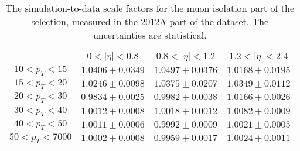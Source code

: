 \begin{table}[!ht]
\begin{center}
\begin{tabular}{c|c|c|c}
\hline & $0 < |\eta| < 0.8$ & $0.8 < |\eta| < 1.2$ & $1.2 < |\eta| < 2.4$  \\
\hline
$ 10 < p_T <  15$ & $1.0406 \pm 0.0349$ & $1.0497 \pm 0.0376$ & $1.0168 \pm 0.0195$  \\
$ 15 < p_T <  20$ & $1.0246 \pm 0.0098$ & $1.0375 \pm 0.0207$ & $1.0349 \pm 0.0112$  \\
$ 20 < p_T <  30$ & $0.9834 \pm 0.0025$ & $0.9982 \pm 0.0038$ & $1.0166 \pm 0.0026$  \\
$ 30 < p_T <  40$ & $1.0012 \pm 0.0008$ & $1.0018 \pm 0.0012$ & $1.0082 \pm 0.0009$  \\
$ 40 < p_T <  50$ & $1.0011 \pm 0.0006$ & $0.9992 \pm 0.0009$ & $1.0021 \pm 0.0005$  \\
$ 50 < p_T < 7000$ & $1.0002 \pm 0.0008$ & $0.9959 \pm 0.0017$ & $1.0024 \pm 0.0011$  \\
\hline
\end{tabular}
\caption{The simulation-to-data scale factors for the muon
isolation part of the selection, measured in the 2012A part 
of the dataset. The uncertainties are statistical.}
\label{tab:eff_muon_iso}
\end{center}
\end{table}

